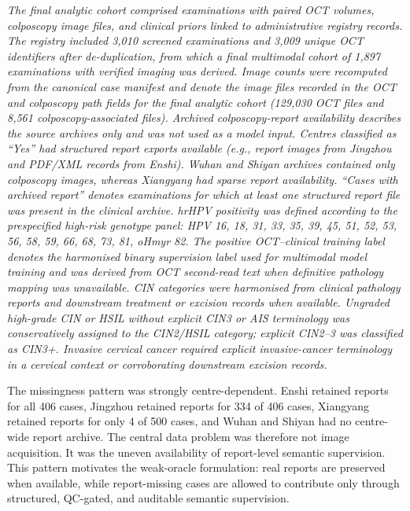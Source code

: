 \documentclass[11pt, a4paper]{article}
\theoremstyle{plain}
\theoremstyle{definition}
\begin{document}
\begin{landscape}
\begin{center}
\begin{minipage}{1\linewidth}
\begin{minipage}{\linewidth}
      \textit{The final analytic cohort comprised examinations with paired OCT volumes, colposcopy image files, and clinical priors linked to administrative registry records. The registry included 3,010 screened examinations and 3,009 unique OCT identifiers after de-duplication, from which a final multimodal cohort of 1,897 examinations with verified imaging was derived. Image counts were recomputed from the canonical case manifest and denote the image files recorded in the OCT and colposcopy path fields for the final analytic cohort (129,030 OCT files and 8,561 colposcopy-associated files). Archived colposcopy-report availability describes the source archives only and was not used as a model input. Centres classified as ``Yes'' had structured report exports available (e.g., report images from Jingzhou and PDF/XML records from Enshi). Wuhan and Shiyan archives contained only colposcopy images, whereas Xiangyang had sparse report availability. ``Cases with archived report'' denotes examinations for which at least one structured report file was present in the clinical archive. hrHPV positivity was defined according to the prespecified high-risk genotype panel: HPV 16, 18, 31, 33, 35, 39, 45, 51, 52, 53, 56, 58, 59, 66, 68, 73, 81, oHmyr 82. The positive OCT--clinical training label denotes the harmonised binary supervision label used for multimodal model training and was derived from OCT second-read text when definitive pathology mapping was unavailable. CIN categories were harmonised from clinical pathology reports and downstream treatment or excision records when available. Ungraded high-grade CIN or HSIL without explicit CIN3 or AIS terminology was conservatively assigned to the CIN2/HSIL category; explicit CIN2--3 was classified as CIN3+. Invasive cervical cancer required explicit invasive-cancer terminology in a cervical context or corroborating downstream excision records.}
    \end{minipage}
  \end{minipage}
\end{center}
\end{landscape}

The missingness pattern was strongly centre-dependent. Enshi retained reports for all 406 cases, Jingzhou retained reports for 334 of 406 cases, Xiangyang retained reports for only 4 of 500 cases, and Wuhan and Shiyan had no centre-wide report archive. The central data problem was therefore not image acquisition. It was the uneven availability of report-level semantic supervision. This pattern motivates the weak-oracle formulation: real reports are preserved when available, while report-missing cases are allowed to contribute only through structured, QC-gated, and auditable semantic supervision.
\end{document}

